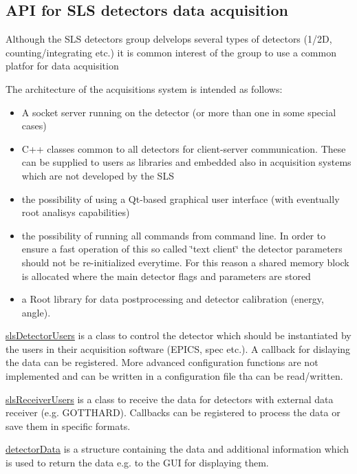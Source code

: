 \subsection*{API for SLS detectors data acquisition}





Although the SLS detectors group delvelops several types of detectors (1/2D, counting/integrating etc.) it is common interest of the group to use a common platfor for data acquisition

The architecture of the acquisitions system is intended as follows: \begin{itemize}
\item A socket server running on the detector (or more than one in some special cases) \item C++ classes common to all detectors for client-server communication. These can be supplied to users as libraries and embedded also in acquisition systems which are not developed by the SLS \item the possibility of using a Qt-based graphical user interface (with eventually root analisys capabilities) \item the possibility of running all commands from command line. In order to ensure a fast operation of this so called \char`\"{}text client\char`\"{} the detector parameters should not be re-initialized everytime. For this reason a shared memory block is allocated where the main detector flags and parameters are stored \item a Root library for data postprocessing and detector calibration (energy, angle).\end{itemize}
\hyperlink{classslsDetectorUsers}{sls\-Detector\-Users} is a class to control the detector which should be instantiated by the users in their acquisition software (EPICS, spec etc.). A callback for dislaying the data can be registered. More advanced configuration functions are not implemented and can be written in a configuration file tha can be read/written.

\hyperlink{classslsReceiverUsers}{sls\-Receiver\-Users} is a class to receive the data for detectors with external data receiver (e.g. GOTTHARD). Callbacks can be registered to process the data or save them in specific formats.

\hyperlink{classdetectorData}{detector\-Data} is a structure containing the data and additional information which is used to return the data e.g. to the GUI for displaying them.

